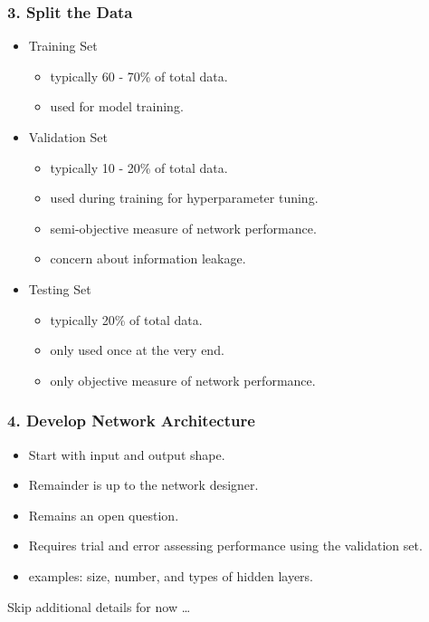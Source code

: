 \documentclass{beamer}
\begin{document}
\begin{frame}
    \frametitle{3. Split the Data}

    \begin{itemize}
        \item Training Set
        \begin{itemize}
            \item typically 60 - 70\% of total data.
            \item used for model training.
        \end{itemize}
        \item Validation Set
        \begin{itemize}
            \item typically 10 - 20\% of total data.
            \item used during training for hyperparameter tuning.
            \item semi-objective measure of network performance.
            \item concern about information leakage.
        \end{itemize}
        \item Testing Set
        \begin{itemize}
            \item typically 20\% of total data.
            \item only used once at the very end.
            \item only objective measure of network performance.
        \end{itemize}

    \end{itemize}
\end{frame}

\begin{frame}
    \frametitle{4. Develop Network Architecture}

    \begin{itemize}
        \item Start with input and output shape.
        \item Remainder is up to the network designer.
        \item Remains an open question.
        \item Requires trial and error assessing performance using the validation set.
        \item examples: size, number, and types of hidden layers.
    \end{itemize}

    \vskip20pt

    Skip additional details for now …

\end{frame}
\end{document}
